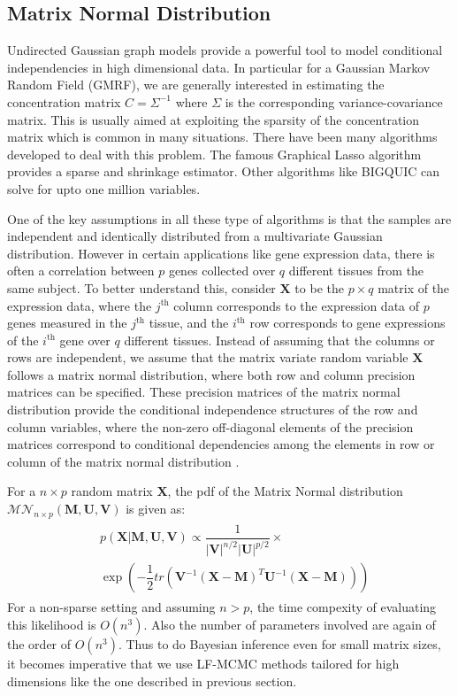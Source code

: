 \begin{multicols}{2}
\section{Matrix Normal Distribution}
Undirected Gaussian graph models provide a powerful tool to model conditional independencies in high dimensional data\cite{yuan2007model}. In particular for a Gaussian Markov Random Field (GMRF)\cite{friedman2001elements, friedman2008sparse}, we are generally interested in estimating the concentration matrix $C=\Sigma^{-1}$ where $\Sigma$ is the corresponding variance-covariance matrix. This is usually aimed at exploiting the sparsity of the concentration matrix which is common in many situations. There have been many algorithms developed to deal with this problem. The famous Graphical Lasso algorithm\cite{friedman2008sparse} provides a sparse and shrinkage estimator. Other algorithms like BIGQUIC\cite{hsieh2013big} can solve for upto one million variables. 

One of the key assumptions in all these type of algorithms is that the samples are independent and identically distributed from a multivariate Gaussian distribution. However in certain applications like gene expression data, there is often a correlation between $p$ genes collected over $q$ different tissues from the same subject. To better understand this, consider $\mathbf{X}$ to be the $p\times q$ matrix of the expression data, where the $j^{\text{th}}$ column corresponds to the expression data of $p$ genes measured in the $j^{\text{th}}$ tissue, and the $i^{\text{th}}$ row corresponds to gene expressions of the $i^{\text{th}}$ gene over $q$ different tissues\cite{yin2012model}. Instead of assuming that the columns or rows are independent, we assume that the matrix variate random variable $\mathbf{X}$ follows a matrix normal distribution\cite{dawid1981some}, where both row and column precision matrices can be specified. These precision matrices of the matrix normal distribution provide the conditional independence structures of the row and column variables, where the non-zero off-diagonal elements of the precision matrices correspond to conditional dependencies among the elements in row or column of the matrix normal distribution \cite{yin2012model}.

For a $n\times p$ random matrix $\mathbf{X}$, the pdf of the Matrix Normal distribution $\mathcal{MN}_{n\times p}(\mathbf{M,U,V})$ is given as:
\begin{align}
\label{eq11}
\begin{split}
&p(\mathbf{X|M,U,V})\propto \dfrac{1}{|\mathbf{V}|^{n/2}|\mathbf{U}|^{p/2}}\times\\ &\exp\left(-\dfrac{1}{2}tr(\mathbf{V}^{-1}(\mathbf{X}-\mathbf{M})^T\mathbf{U}^{-1}(\mathbf{X}-\mathbf{M}))\right)
\end{split}
\end{align}
For a non-sparse setting and assuming $n>p$, the time compexity of evaluating this likelihood is $O(n^3)$. Also the number of parameters involved are again of the order of $O(n^3)$. Thus to do Bayesian inference even for small matrix sizes, it becomes imperative that we use LF-MCMC methods tailored for high dimensions like the one described in previous section.


\end{multicols}
